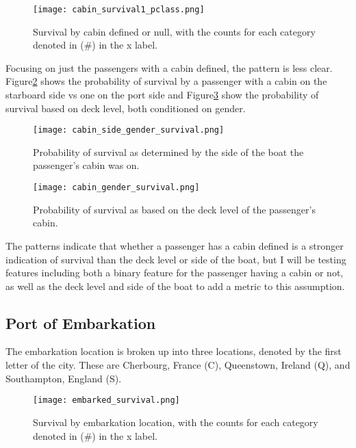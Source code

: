 \documentclass[12pt, letterpaper]{article}
\begin{document}
\begin{figure}[H]
    \centering
    \texttt{[image: cabin\_survival1\_pclass.png]}
    \caption{Survival by cabin defined or null, with the counts for each category denoted in (\#) in the x label. }
    \label{fig:cabin_prob}
\end{figure}

Focusing on just the passengers with a cabin defined, the pattern is less clear. Figure\ref{fig:cabin_side} shows the probability of survival by a passenger with a cabin on the starboard side vs one on the port side and Figure\ref{fig:cabin_deck} show the probability of survival based on deck level, both conditioned on gender. 

\begin{figure}[H]
    \centering
    \texttt{[image: cabin\_side\_gender\_survival.png]}
    \caption{Probability of survival as determined by the side of the boat the passenger's cabin was on. }
    \label{fig:cabin_side}
\end{figure}

\begin{figure}[H]
    \centering
    \texttt{[image: cabin\_gender\_survival.png]}
    \caption{Probability of survival as based on the deck level of the passenger's cabin.}
    \label{fig:cabin_deck}
\end{figure}

The patterns indicate that whether a passenger has a cabin defined is a stronger indication of survival than the deck level or side of the boat, but I will be testing features including both a binary feature for the passenger having a cabin or not, as well as the deck level and side of the boat to add a metric to this assumption. 

\subsection{Port of Embarkation}

The embarkation location is broken up into three locations, denoted by the first letter of the city. These are Cherbourg, France (C), Queenstown, Ireland (Q), and Southampton, England (S). 

\begin{figure}[H]
    \centering
    \texttt{[image: embarked\_survival.png]}
    \caption{Survival by embarkation location, with the counts for each category denoted in (\#) in the x label. }
    \label{fig:embarked_prob}
\end{figure}
\end{document}
